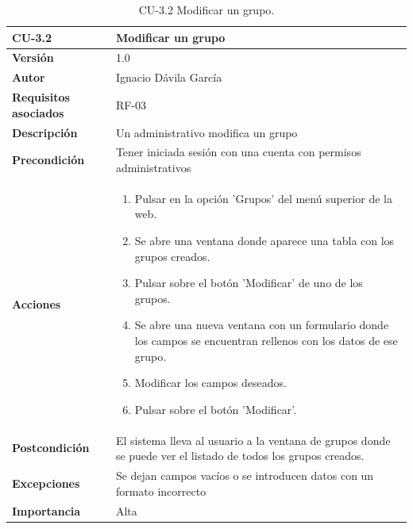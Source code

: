 \begin{table}[p]
	\centering
	\begin{tabularx}{\linewidth}{ p{} p{} }
		\toprule
		\textbf{CU-3.2}    & \textbf{Modificar un grupo}\\
		\toprule
		\textbf{Versión}              & 1.0    \\
		\textbf{Autor}                & Ignacio Dávila García \\
		\textbf{Requisitos asociados} & RF-03 \\
		\textbf{Descripción}          & Un administrativo modifica un grupo \\
		\textbf{Precondición}         & Tener iniciada sesión con una cuenta con permisos administrativos \\
		\textbf{Acciones}             &
		\begin{enumerate}
			\def\labelenumi{\arabic{enumi}.}
			\tightlist
			\item Pulsar en la opción 'Grupos' del menú superior de la web.
			\item Se abre una ventana donde aparece una tabla con los grupos creados.
			\item Pulsar sobre el botón 'Modificar' de uno de los grupos.
			\item Se abre una nueva ventana con un formulario donde los campos se encuentran rellenos con los datos de ese grupo.
			\item Modificar los campos deseados.
			\item Pulsar sobre el botón 'Modificar'.
		\end{enumerate}\\
		\textbf{Postcondición}        & El sistema lleva al usuario a la ventana de grupos donde se puede ver el listado de todos los grupos creados. \\
		\textbf{Excepciones}          & Se dejan campos vacíos o se introducen datos con un formato incorrecto \\
		\textbf{Importancia}          & Alta \\
		\bottomrule
	\end{tabularx}
	\caption{CU-3.2 Modificar un grupo.}
\end{table}


